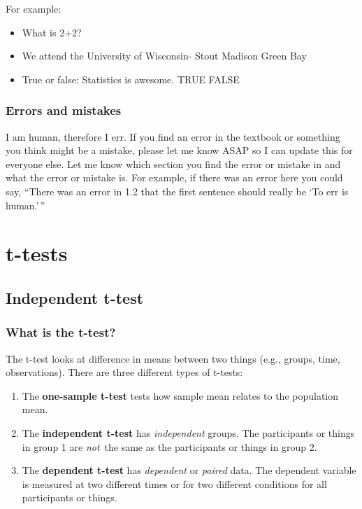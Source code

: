 \documentclass[
]{book}
\begin{document}
For example:

\begin{itemize}
\item
  What is 2+2?
\item
  We attend the University of Wisconsin- Stout Madison Green Bay
\item
  True or false: Statistics is awesome. TRUE FALSE
\end{itemize}

\hypertarget{errors-and-mistakes}{%
\section{Errors and mistakes}\label{errors-and-mistakes}}

I am human, therefore I err. If you find an error in the textbook or something you think might be a mistake, please let me know ASAP so I can update this for everyone else. Let me know which section you find the error or mistake in and what the error or mistake is. For example, if there was an error here you could say, ``There was an error in 1.2 that the first sentence should really be `To err is human.'\,''

\hypertarget{part-t-tests}{%
\part{t-tests}\label{part-t-tests}}

\hypertarget{independent-t-test}{%
\chapter{Independent t-test}\label{independent-t-test}}

\hypertarget{what-is-the-t-test}{%
\section{What is the t-test?}\label{what-is-the-t-test}}

The t-test looks at difference in means between two things (e.g., groups, time, observations). There are three different types of t-tests:

\begin{enumerate}
\def\labelenumi{\arabic{enumi}.}
\item
  The \textbf{one-sample t-test} tests how sample mean relates to the population mean.
\item
  The \textbf{independent t-test} has \emph{independent} groups. The participants or things in group 1 are \emph{not}~the same as the participants or things in group 2.
\item
  The \textbf{dependent t-test} has \emph{dependent} or \emph{paired} data. The dependent variable is measured at two different times or for two different conditions for all participants or things.
\end{enumerate}
\end{document}
